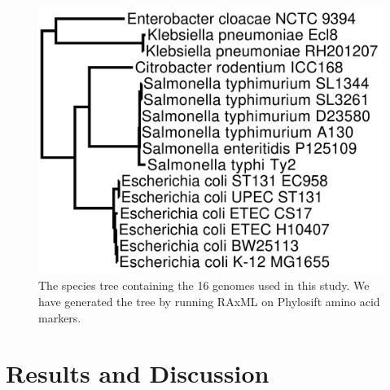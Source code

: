 \documentclass[12pt,letterpaper]{article}
\begin{document}


\begin{figure}
\includegraphics[scale=0.2]{phylosift-aa-raxmlbootstrap.pdf}
\caption{The species tree containing the 16 genomes used in this study. We have generated the tree by running RAxML \cite{stamatakis_raxml_2014} on Phylosift \cite{darling_phylosift:_2014} amino acid markers.}
\label{fig:species-tree}
\end{figure}

\section{Results and Discussion}
\end{document}
